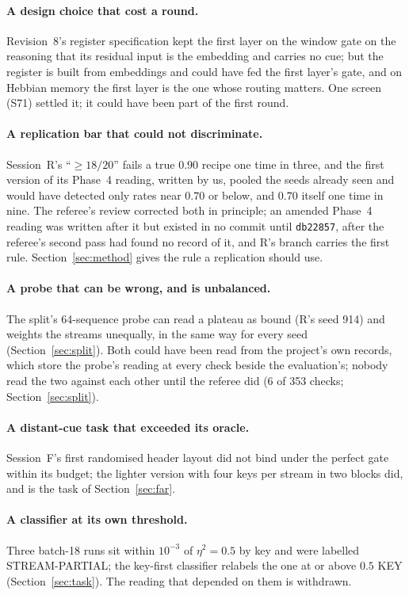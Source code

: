 \documentclass[11pt]{article}
\begin{document}
\paragraph{A design choice that cost a round.} Revision~8's register specification kept the first layer on the window gate on the reasoning that its residual input is the embedding and carries no cue; but the register is built from embeddings and could have fed the first layer's gate, and on Hebbian memory the first layer is the one whose routing matters. One screen (S71) settled it; it could have been part of the first round.

\paragraph{A replication bar that could not discriminate.} Session~R's ``$\geq 18/20$'' fails a true $0.90$ recipe one time in three, and the first version of its Phase~4 reading, written by us, pooled the seeds already seen and would have detected only rates near $0.70$ or below, and $0.70$ itself one time in nine. The referee's review corrected both in principle; an amended Phase~4 reading was written after it but existed in no commit until \texttt{db22857}, after the referee's second pass had found no record of it, and R's branch carries the first rule. Section~\ref{sec:method} gives the rule a replication should use.

\paragraph{A probe that can be wrong, and is unbalanced.} The split's 64-sequence probe can read a plateau as bound (R's seed 914) and weights the streams unequally, in the same way for every seed (Section~\ref{sec:split}). Both could have been read from the project's own records, which store the probe's reading at every check beside the evaluation's; nobody read the two against each other until the referee did (6 of 353 checks; Section~\ref{sec:split}).

\paragraph{A distant-cue task that exceeded its oracle.} Session~F's first randomised header layout did not bind under the perfect gate within its budget; the lighter version with four keys per stream in two blocks did, and is the task of Section~\ref{sec:far}.

\paragraph{A classifier at its own threshold.} Three batch-18 runs sit within $10^{-3}$ of $\eta^2 = 0.5$ by key and were labelled STREAM-PARTIAL; the key-first classifier relabels the one at or above $0.5$ KEY (Section~\ref{sec:task}). The reading that depended on them is withdrawn.
\end{document}
